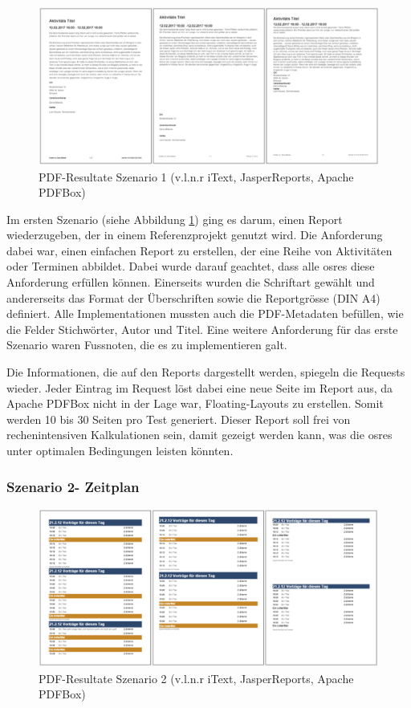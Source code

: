 \documentclass[main.tex]{subfiles}
\begin{document}
\begin{figure}[h]
\includegraphics[width=\textwidth]{mainpart/3_methodik_evaluation_img/Szenario1PDF.PNG}
 \caption{PDF-Resultate Szenario 1 (v.l.n.r iText, JasperReports, Apache PDFBox)}
 \label{figure:PDFResultSzen1}
\end{figure}


Im ersten Szenario (siehe Abbildung \ref{figure:PDFResultSzen1}) ging es darum, einen Report wiederzugeben, der in einem Referenzprojekt genutzt wird. Die Anforderung dabei war, einen einfachen Report zu erstellen, der eine Reihe von Aktivitäten oder Terminen abbildet. Dabei wurde darauf geachtet, dass alle \acrshort{osre}s diese Anforderung erfüllen können. Einerseits wurden die Schriftart gewählt und andererseits das Format der Überschriften sowie die Reportgrösse (DIN A4) definiert. Alle Implementationen mussten auch die PDF-Metadaten befüllen, wie die Felder Stichwörter, Autor und Titel. Eine weitere Anforderung für das erste Szenario waren Fussnoten, die es zu implementieren galt.

Die Informationen, die auf den Reports dargestellt werden, spiegeln die Requests wieder. Jeder Eintrag im Request löst dabei eine neue Seite im Report aus, da Apache PDFBox nicht in der Lage war, Floating-Layouts zu erstellen. Somit werden 10 bis 30 Seiten pro Test generiert. Dieser Report soll frei von rechenintensiven Kalkulationen sein, damit gezeigt werden kann, was die \acrshort{osre}s unter optimalen Bedingungen leisten könnten.
 


\subsubsection{Szenario 2- Zeitplan}
\begin{figure}[h]
\includegraphics[width=\textwidth]{mainpart/3_methodik_evaluation_img/Szenario2PDF.PNG}
 \caption{PDF-Resultate Szenario 2 (v.l.n.r iText, JasperReports, Apache PDFBox)}
 \label{figure:PDFResultSzen2}
\end{figure}
\end{document}

